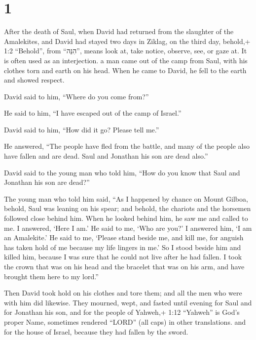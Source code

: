 \hypertarget{section}{%
\section{1}\label{section}}

 After the death of Saul, when David had returned from the
slaughter of the Amalekites, and David had stayed two days in Ziklag,
 on the third day, behold,+ 1:2 ``Behold'', from ``הִנֵּה'',
means look at, take notice, observe, see, or gaze at. It is often used
as an interjection. a man came out of the camp from Saul, with his
clothes torn and earth on his head. When he came to David, he fell to
the earth and showed respect.

 David said to him, ``Where do you come from?''

He said to him, ``I have escaped out of the camp of Israel.''

 David said to him, ``How did it go? Please tell me.''

He answered, ``The people have fled from the battle, and many of the
people also have fallen and are dead. Saul and Jonathan his son are dead
also.''

 David said to the young man who told him, ``How do you know
that Saul and Jonathan his son are dead?''

 The young man who told him said, ``As I happened by chance
on Mount Gilboa, behold, Saul was leaning on his spear; and behold, the
chariots and the horsemen followed close behind him.  When
he looked behind him, he saw me and called to me. I answered, `Here I
am.'  He said to me, `Who are you?' I answered him, `I am an
Amalekite.'  He said to me, `Please stand beside me, and
kill me, for anguish has taken hold of me because my life lingers in
me.'  So I stood beside him and killed him, because I was
sure that he could not live after he had fallen. I took the crown that
was on his head and the bracelet that was on his arm, and have brought
them here to my lord.''

 Then David took hold on his clothes and tore them; and all
the men who were with him did likewise.  They mourned,
wept, and fasted until evening for Saul and for Jonathan his son, and
for the people of Yahweh,+ 1:12 ``Yahweh'' is God's proper Name,
sometimes rendered ``LORD'' (all caps) in other translations. and for
the house of Israel, because they had fallen by the sword.

